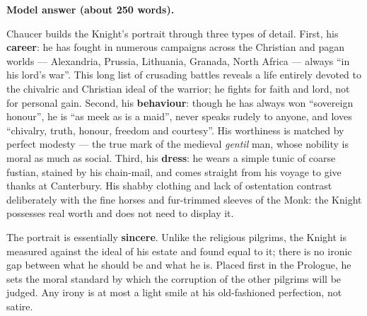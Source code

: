 \documentclass[11pt]{article}
\begin{document}
\begin{corrige}
\textbf{Model answer (about 250 words).}

Chaucer builds the Knight's portrait through three types of detail. First, his \textbf{career}: he has fought in numerous campaigns across the Christian and pagan worlds — Alexandria, Prussia, Lithuania, Granada, North Africa — always ``in his lord's war''. This long list of crusading battles reveals a life entirely devoted to the chivalric and Christian ideal of the warrior; he fights for faith and lord, not for personal gain. Second, his \textbf{behaviour}: though he has always won ``sovereign honour'', he is ``as meek as is a maid'', never speaks rudely to anyone, and loves ``chivalry, truth, honour, freedom and courtesy''. His worthiness is matched by perfect modesty — the true mark of the medieval \emph{gentil} man, whose nobility is moral as much as social. Third, his \textbf{dress}: he wears a simple tunic of coarse fustian, stained by his chain-mail, and comes straight from his voyage to give thanks at Canterbury. His shabby clothing and lack of ostentation contrast deliberately with the fine horses and fur-trimmed sleeves of the Monk: the Knight possesses real worth and does not need to display it.

The portrait is essentially \textbf{sincere}. Unlike the religious pilgrims, the Knight is measured against the ideal of his estate and found equal to it; there is no ironic gap between what he should be and what he is. Placed first in the Prologue, he sets the moral standard by which the corruption of the other pilgrims will be judged. Any irony is at most a light smile at his old-fashioned perfection, not satire.
\end{corrige}
\end{document}

